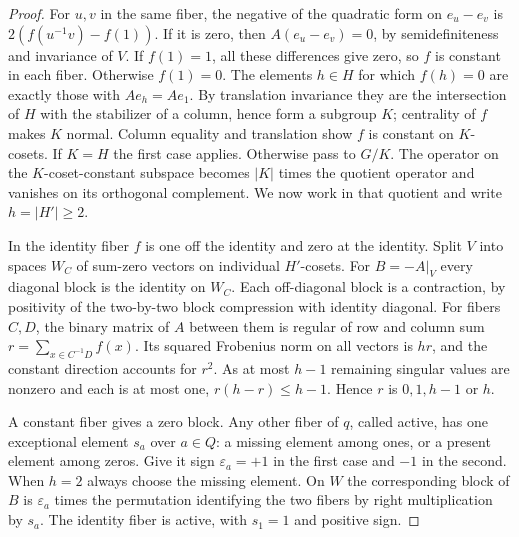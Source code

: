 \begin{proof}
For $u,v$ in the same fiber, the negative of the quadratic form on $e_u-e_v$ is $2(f(u^{-1}v)-f(1))$. If it is zero, then $A(e_u-e_v)=0$, by semidefiniteness and invariance of $V$. If $f(1)=1$, all these differences give zero, so $f$ is constant in each fiber. Otherwise $f(1)=0$. The elements $h\in H$ for which $f(h)=0$ are exactly those with $A e_h=A e_1$. By translation invariance they are the intersection of $H$ with the stabilizer of a column, hence form a subgroup $K$; centrality of $f$ makes $K$ normal. Column equality and translation show $f$ is constant on $K$-cosets. If $K=H$ the first case applies. Otherwise pass to $G/K$. The operator on the $K$-coset-constant subspace becomes $|K|$ times the quotient operator and vanishes on its orthogonal complement. We now work in that quotient and write $h=|H'|\ge2$.

In the identity fiber $f$ is one off the identity and zero at the identity. Split $V$ into spaces $W_C$ of sum-zero vectors on individual $H'$-cosets. For $B=-A|_V$ every diagonal block is the identity on $W_C$. Each off-diagonal block is a contraction, by positivity of the two-by-two block compression with identity diagonal. For fibers $C,D$, the binary matrix of $A$ between them is regular of row and column sum $r=\sum_{x\in C^{-1}D}f(x)$. Its squared Frobenius norm on all vectors is $hr$, and the constant direction accounts for $r^2$. As at most $h-1$ remaining singular values are nonzero and each is at most one, $r(h-r)\le h-1$. Hence $r$ is $0,1,h-1$ or $h$.

A constant fiber gives a zero block. Any other fiber of $q$, called active, has one exceptional element $s_a$ over $a\in Q$: a missing element among ones, or a present element among zeros. Give it sign $\varepsilon_a=+1$ in the first case and $-1$ in the second. When $h=2$ always choose the missing element. On $W$ the corresponding block of $B$ is $\varepsilon_a$ times the permutation identifying the two fibers by right multiplication by $s_a$. The identity fiber is active, with $s_1=1$ and positive sign.


\end{proof}
